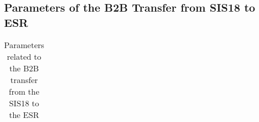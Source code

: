   
\subsection{Parameters of the B2B Transfer from SIS18 to ESR}
\label{sec:18toESR}



% 
    \begin{longtable*}{ | c | c | c | c | c | c |}

	\caption{Parameters related to the B2B transfer from the SIS18 to the ESR}\label{18toESR}\\


\end{longtable*}
